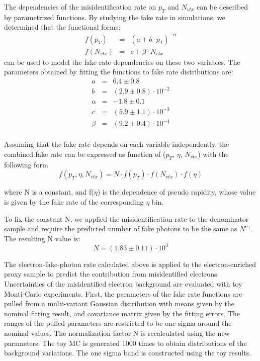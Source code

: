 \documentclass[thesis.tex]{subfiles}
\renewcommand\_{\textunderscore\allowbreak}
\begin{document}
The dependencies of the misidentification rate on $p_T$ and $N_{vtx}$ can be described by parametrized functions. By studying the fake rate in simulations, we determined that the functional forms: 
\begin{eqnarray*}
	f(p_{T})   &=& ( a + b\cdot p_T)^{-\alpha} \\
	f(N_{vtx}) &=& c + \beta \cdot N_{vtx}
\end{eqnarray*}
can be used to model the fake rate dependencies on these two variables. The parameters obtained by fitting the functions to fake rate distributions are: 
\begin{eqnarray*}
	a   &=& 6.4 \pm 0.8  \\
	b   &=& (2.9 \pm 0.8) \cdot 10^{-2} \\
	\alpha &=& -1.8 \pm 0.1 \\
	c &=& (5.9 \pm 1.1) \cdot 10^{-3} \\
	\beta &=& (9.2 \pm 0.4) \cdot 10^{-4} \\
\end{eqnarray*}

 Assuming that the fake rate depends on each variable independently, the combined fake rate can be expressed as function of ($p_T$, $\eta$, $N_{vtx}$) with the following form 
\begin{equation} 
	f(p_{T}, \eta, N_{vtx}) = N \cdot f(p_T) \cdot f(N_{vtx}) \cdot f(\eta)
\end{equation}

where N is a constant, and f($\eta$) is the dependence of pseudo rapidity, whose value is given by the fake rate of the corresponding $\eta$ bin. 

To fix the constant N, we applied the misidentification rate to the denominator sample and require the predicted number of fake photons to be the same as $N^{e\gamma}$. The resulting N value is: 
\begin{equation} 
	N = (1.83 \pm 0.11) \cdot 10^{3}
\end{equation}


The electron-fake-photon rate calculated above is applied to the electron-enriched proxy sample to predict the contribution from misidentified electrons. Uncertainties of the misidentified electron background are evaluated with toy Monti-Carlo experiments. First, the parameters of the fake rate functions are pulled from a multi-variant Gaussian distribution with means given by the nominal fitting result, and covariance matrix given by the fitting errors. The ranges of the pulled parameters are restricted to be one sigma around the nominal values. The normalization factor N is recalculated using the new parameters. The toy MC is generated 1000 times to obtain distributions of the background variations. The one sigma band is constructed using the toy results.
\end{document}
